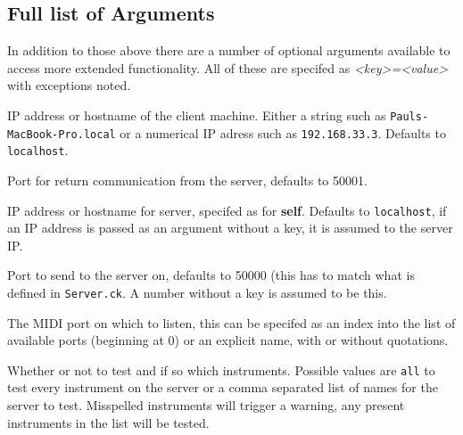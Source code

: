 \documentclass{article}
\begin{document}
\subsection{Full list of Arguments}
In addition to those above there are a number of optional arguments available to access more extended functionality. All of these are specifed as \emph{<key>=<value>} with exceptions
noted.
\begin{description} [style=multiline, labelwidth=\widthof{\bfseries server}]
	\item[self] IP address or hostname of the client machine. Either a string such as \texttt{Pauls-MacBook-Pro.local} or a numerical IP adress such as \texttt{192.168.33.3}. 
			Defaults to \texttt{localhost}.
	\item[in] Port for return communication from the server, defaults to 50001.
	\item[server] IP address or hostname for server, specifed as for \textbf{self}. Defaults to \texttt{localhost}, if an IP address is passed as an argument without a key, it is assumed to 
			    the server IP.
	\item[out] Port to send to the server on, defaults to 50000 (this has to match what is defined in \texttt{Server.ck}. A number without a key is assumed to be this.
	\item[midi] The MIDI port on which to listen, this can be specifed as an index into the list of available ports (beginning at 0) or an explicit name, with or without quotations.
	\item[test] Whether or not to test and if so which instruments. Possible values are \texttt{all} to test every instrument on the server or a comma separated list of names
			for the server to test. Misspelled instruments will trigger a warning, any present instruments in the list will be tested.
\end{description}
\end{document}
